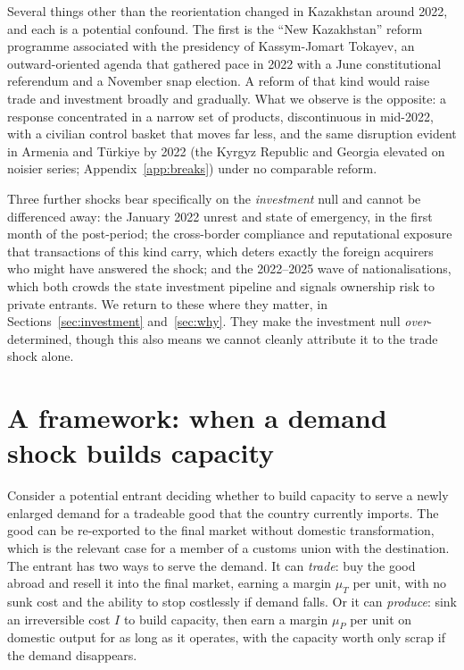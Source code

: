 \documentclass[12pt]{article}
\begin{document}
Several things other than the reorientation changed in Kazakhstan around 2022, and each is a
potential confound. The first is the ``New Kazakhstan'' reform programme associated with the
presidency of Kassym-Jomart Tokayev, an outward-oriented agenda that gathered pace in 2022
with a June constitutional referendum and a November snap election. A reform of that kind would
raise trade and investment broadly and gradually. What we observe is the opposite: a response
concentrated in a narrow set of products, discontinuous in mid-2022, with a civilian control
basket that moves far less, and the same disruption evident in Armenia and T\"urkiye by 2022
(the Kyrgyz Republic and Georgia elevated on noisier series; Appendix~\ref{app:breaks}) under no
comparable reform.

Three further shocks bear specifically on the \emph{investment} null and cannot be differenced
away: the January 2022 unrest and state of emergency, in the first month of
the post-period; the cross-border compliance and reputational exposure that transactions of
this kind carry, which deters exactly the foreign acquirers who might have answered the shock;
and the 2022--2025 wave of nationalisations, which both crowds the state investment pipeline and
signals ownership risk to private entrants. We return to these where they matter, in
Sections~\ref{sec:investment} and~\ref{sec:why}. They make the investment null
\emph{over}-determined, though this also means we cannot cleanly attribute it
to the trade shock alone.

\section{A framework: when a demand shock builds capacity}\label{sec:framework}

Consider a potential entrant deciding whether to build capacity to serve a newly enlarged
demand for a tradeable good that the country currently imports. The good can be re-exported to
the final market without domestic transformation, which is the relevant case for a member of a
customs union with the destination. The entrant has two ways to serve the demand. It can
\emph{trade}: buy the good abroad and resell it into the final market, earning a margin
$\mu_T$ per unit, with no sunk cost and the ability to stop costlessly if demand falls. Or it
can \emph{produce}: sink an irreversible cost $I$ to build capacity, then earn a margin
$\mu_P$ per unit on domestic output for as long as it operates, with the capacity worth only
scrap if the demand disappears.
\end{document}
